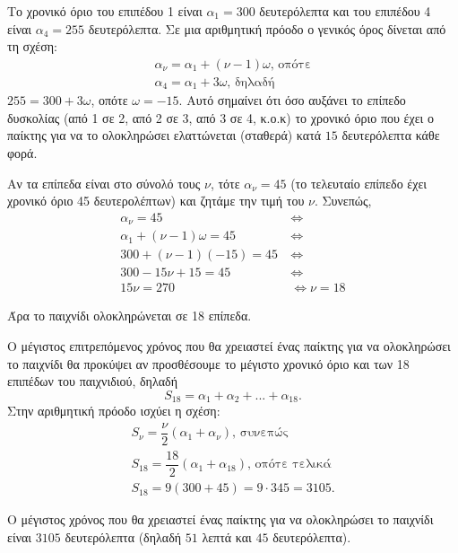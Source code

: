
\begin{alist}
\item Το χρονικό όριο του επιπέδου 1 είναι $\alpha_1 = 300$ δευτερόλεπτα και του επιπέδου 4 είναι $\alpha_4 = 255$ δευτερόλεπτα. Σε μια αριθμητική πρόοδο ο γενικός όρος δίνεται από τη σχέση:
\begin{gather*}
\alpha_\nu = \alpha_1 + (\nu - 1)\omega\text{, οπότε} \\
\alpha_4 = \alpha_1 + 3\omega\text{, δηλαδή}
\end{gather*}
$255 = 300 + 3\omega$, οπότε $\omega = -15$.
Αυτό σημαίνει ότι όσο αυξάνει το επίπεδο δυσκολίας (από 1 σε 2, από 2 σε 3, από 3 σε 4, κ.ο.κ) το χρονικό όριο που έχει ο παίκτης για να το ολοκληρώσει ελαττώνεται (σταθερά) κατά $15$ δευτερόλεπτα κάθε φορά.

\item Αν τα επίπεδα είναι στο σύνολό τους $\nu$, τότε $\alpha_\nu = 45$ (το τελευταίο επίπεδο έχει χρονικό όριο 45 δευτερολέπτων) και ζητάμε την τιμή του $\nu$. Συνεπώς,
\begin{align*}
\alpha_\nu = 45 \ &\Leftrightarrow \\
\alpha_1 + (\nu - 1)\omega = 45 \ &\Leftrightarrow \\
300 + (\nu - 1)(-15) = 45 \ &\Leftrightarrow \\
300 - 15\nu + 15 = 45 \ &\Leftrightarrow \\
15\nu = 270 &\Leftrightarrow \nu = 18
\end{align*}

Άρα το παιχνίδι ολοκληρώνεται σε 18 επίπεδα.

\item Ο μέγιστος επιτρεπόμενος χρόνος που θα χρειαστεί ένας παίκτης για να ολοκληρώσει το παιχνίδι θα προκύψει αν προσθέσουμε το μέγιστο χρονικό όριο και των 18 επιπέδων του παιχνιδιού, δηλαδή
\[S_{18} = \alpha_1 + \alpha_2 + ... + \alpha_{18}.\]
Στην αριθμητική πρόοδο ισχύει η σχέση:
\begin{gather*}
S_\nu = \dfrac{\nu}{2}(\alpha_1 + \alpha_\nu)\text{, συνεπώς} \\
S_{18} = \dfrac{18}{2}(\alpha_1 + \alpha_{18})\text{, οπότε τελικά} \\
S_{18} = 9(300 + 45) = 9 \cdot 345 = 3105.
\end{gather*}

Ο μέγιστος χρόνος που θα χρειαστεί ένας παίκτης για να ολοκληρώσει το παιχνίδι είναι $3105$ δευτερόλεπτα (δηλαδή $51$ λεπτά και $45$ δευτερόλεπτα).


\end{alist}
